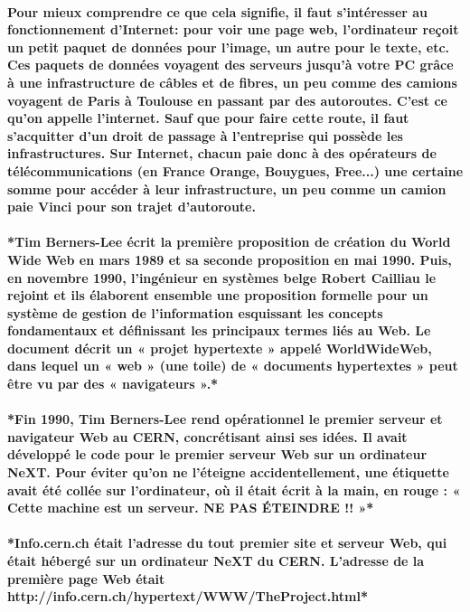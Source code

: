 \paragraph{
  Pour mieux comprendre ce que cela signifie, il faut s'intéresser au fonctionnement d'Internet: pour voir une page web, l'ordinateur reçoit un petit paquet de données pour l'image, un autre pour le texte, etc. Ces paquets de données voyagent des serveurs jusqu'à votre PC grâce à une infrastructure de câbles et de fibres, un peu comme des camions voyagent de Paris à Toulouse en passant par des autoroutes. C'est ce qu'on appelle l'internet. Sauf que pour faire cette route, il faut s'acquitter d'un droit de passage à l'entreprise qui possède les infrastructures. Sur Internet, chacun paie donc à des opérateurs de télécommunications (en France Orange, Bouygues, Free...) une certaine somme pour accéder à leur infrastructure, un peu comme un camion paie Vinci pour son trajet d'autoroute.
}

\paragraph{
  *Tim Berners-Lee écrit la première proposition de création du World Wide Web en mars 1989 et sa seconde proposition en mai 1990. Puis, en novembre 1990, l’ingénieur en systèmes belge Robert Cailliau le rejoint et ils élaborent ensemble une proposition formelle pour un système de gestion de l'information esquissant les concepts fondamentaux et définissant les principaux termes liés au Web. Le document décrit un « projet hypertexte » appelé WorldWideWeb, dans lequel un « web » (une toile) de « documents hypertextes » peut être vu par des « navigateurs ».*
}

\paragraph{
  *Fin 1990, Tim Berners-Lee rend opérationnel le premier serveur et navigateur Web au CERN, concrétisant ainsi ses idées. Il avait développé le code pour le premier serveur Web sur un ordinateur NeXT. Pour éviter qu'on ne l'éteigne accidentellement, une étiquette avait été collée sur l'ordinateur, où il était écrit à la main, en rouge : « Cette machine est un serveur. NE PAS ÉTEINDRE !! »*
}

\paragraph{
  *Info.cern.ch était l’adresse du tout premier site et serveur Web, qui était hébergé sur un ordinateur NeXT du CERN. L’adresse de la première page Web était http://info.cern.ch/hypertext/WWW/TheProject.html*
}

